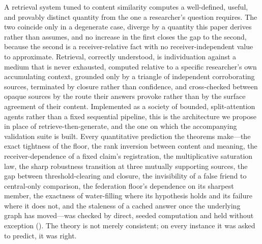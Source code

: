 \documentclass[11pt,twocolumn,a4paper]{article}
\theoremstyle{frathm}
\theoremstyle{definition}
\theoremstyle{remark}
\begin{document}
A retrieval system tuned to content similarity computes a well-defined,
useful, and provably distinct quantity from the one a researcher's
question requires. The two coincide only in a degenerate case,
diverge by a quantity this paper derives rather than assumes, and no
increase in the first closes the gap to the second, because the second is
a receiver-relative fact with no receiver-independent value to
approximate. Retrieval, correctly understood, is individuation against a
medium that is never exhausted, computed relative to a specific
researcher's own accumulating context, grounded only by a triangle of
independent corroborating sources, terminated by closure rather than
confidence, and cross-checked between opaque sources by the route their
answers provoke rather than by the surface agreement of their content.
Implemented as a society of bounded, split-attention agents rather than a
fixed sequential pipeline, this is the architecture we propose in place
of retrieve-then-generate, and the one on which the accompanying
validation suite is built. Every quantitative prediction the theorems
make---the exact tightness of the floor, the rank inversion between
content and meaning, the receiver-dependence of a fixed claim's
registration, the multiplicative saturation law, the sharp robustness
transition at three mutually supporting sources, the gap between
threshold-clearing and closure, the invisibility of a false friend to
central-only comparison, the federation floor's dependence on its
sharpest member, the exactness of water-filling where its hypothesis
holds and its failure where it does not, and the staleness of a cached
answer once the underlying graph has moved---was checked by direct,
seeded computation and held without exception ().
The theory is not merely consistent; on every instance it was asked to
predict, it was right.



\end{document}
